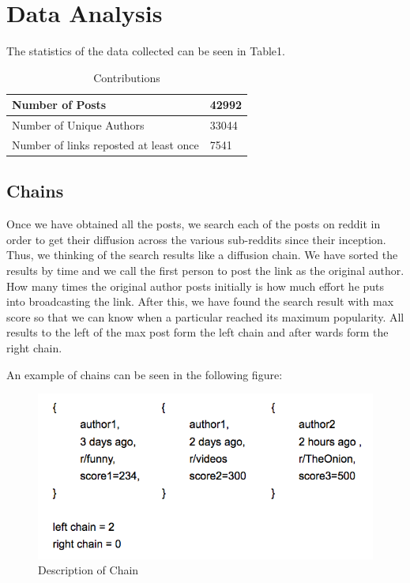\documentclass{article} %
\begin{document}
\section{Data Analysis}

The statistics of the data collected can be seen in Table1.

\begin{table}
\begin{center}
    \begin{tabular}{ | l | l | }
    \hline
    Number of Posts & 42992 \\ \hline
    Number of Unique Authors & 33044 \\ \hline
    Number of links reposted at least once & 7541 \\ \hline
    \end{tabular}
    \caption{Contributions}
\end{center}
\end{table}

\subsection{Chains}

Once we have obtained all the posts, we search each of the posts on reddit in order to get their diffusion across the various sub-reddits since their inception. Thus, we thinking of the search results like a diffusion chain. We have sorted the results by time and we call the first person to post the link as the original author. How many times the original author posts initially is how much effort he puts into broadcasting the link. After this, we have found the search result with max score so that we can know when a particular reached its maximum popularity. All results to the left of the max post form the left chain and after wards form the right chain.

An example of chains can be seen in the following figure:

\begin{figure}[h]
\begin{center}
\includegraphics[width=5in]{chain.png}
\caption{Description of Chain}
\end{center}
\end{figure}
\end{document}
